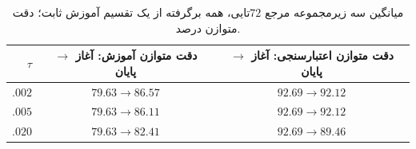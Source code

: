 \begin{table}[htbp]
\centering\small
\caption{میانگین سه زیرمجموعه مرجع $72$تایی، همه برگرفته از یک تقسیم آموزش ثابت؛ دقت متوازن درصد.}
\label{tab:ch4-sigmoid-direct-training-72}
\begin{tabular}{rcc}\hline
$\tau$ & دقت متوازن آموزش: آغاز $\to$ پایان & دقت متوازن اعتبارسنجی: آغاز $\to$ پایان\\\hline
$.002$ & $79.63\to86.57$ & $92.69\to92.12$\\
$.005$ & $79.63\to86.11$ & $92.69\to92.12$\\
$.020$ & $79.63\to82.41$ & $92.69\to89.46$\\\hline
\end{tabular}
\end{table}
